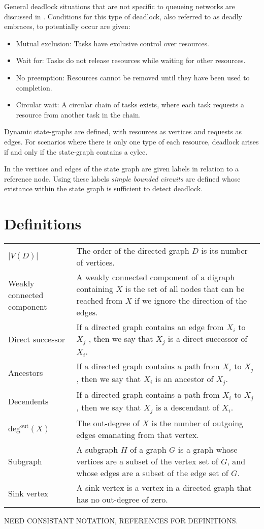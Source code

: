\documentclass{article}
\begin{document}
General deadlock situations that are not specific to queueing networks are discussed in \cite{coffmanelphick71}.
Conditions for this type of deadlock, also referred to as deadly embraces, to potentially occur are given:
\begin{itemize}
  \item Mutual exclusion: Tasks have exclusive control over resources.
  \item Wait for: Tasks do not release resources while waiting for other resources.
  \item No preemption: Resources cannot be removed until they have been used to completion.
  \item Circular wait: A circular chain of tasks exists, where each task requests a resource from another task in the chain.
\end{itemize}
Dynamic state-graphs are defined, with resources as vertices and requests as edges.
For scenarios where there is only one type of each resource, deadlock arises if and only if the state-graph contains a cylce.\newline

In \cite{choetal95} the vertices and edges of the state graph are given labels in relation to a reference node.
Using these labels \textit{simple bounded circuits} are defined whose existance within the state graph is sufficient to detect deadlock.\newline


\section{Definitions}

\begin{tabular}{ p{5cm} p{10cm} }
  $\left| V(D) \right|$ & The order of the directed graph $D$ is its number of vertices. \\
  Weakly connected component & A weakly connected component of a digraph containing $X$ is the set of all nodes that can be reached from $X$ if we ignore the direction of the edges. \\
  Direct successor & If a directed graph contains an edge from $X_i$ to $X_j$ , then we say that $X_j$ is a direct successor of $X_i$. \\
  Ancestors & If a directed graph contains a path from $X_i$ to $X_j$ , then we say that $X_i$ is an ancestor of $X_j$. \\
  Decendents & If a directed graph contains a path from $X_i$ to $X_j$ , then we say that $X_j$ is a descendant of $X_i$. \\
  $\text{deg}^{\text{out}}(X)$ & The out-degree of $X$ is the number of outgoing edges emanating from that vertex. \\
  Subgraph & A subgraph $H$ of a graph $G$ is a graph whose vertices are a subset of the vertex set of $G$, and whose edges are a subset of the edge set of $G$. \\
  Sink vertex & A sink vertex is a vertex in a directed graph that has no out-degree of zero.\\
\end{tabular}
\newline
NEED CONSISTANT NOTATION, REFERENCES FOR DEFINITIONS.
\end{document}
